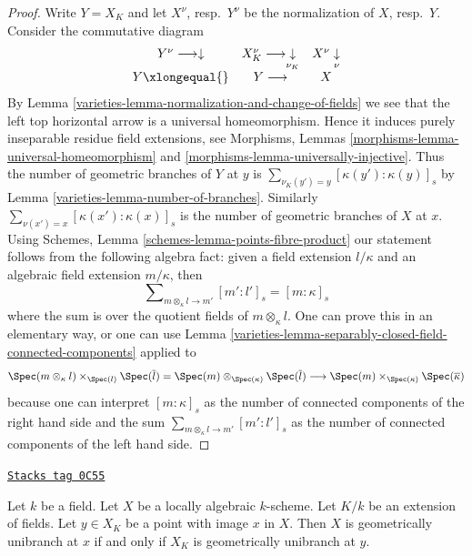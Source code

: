 \begin{proof}

Write $Y = X_K$ and let $X^\nu$, resp.\ $Y^\nu$ be the normalization
of $X$, resp.\ $Y$. Consider the commutative diagram
$$
\begin{array}{ccc}Y^\nu \longrightarrow\downarrow & X^\nu_K \longrightarrow\underset{\nu_K}{\downarrow} & X^\nu \underset{\nu}{\downarrow} \\ Y \xlongequal{} & Y \longrightarrow & X\end{array}
$$
By Lemma \ref{varieties-lemma-normalization-and-change-of-fields} we see that
the left top horizontal arrow is a universal homeomorphism.
Hence it induces purely inseparable residue field extensions, see
Morphisms, Lemmas \ref{morphisms-lemma-universal-homeomorphism} and
\ref{morphisms-lemma-universally-injective}.
Thus the number of geometric branches of $Y$ at $y$ is
$\sum_{\nu_K(y') = y} [\kappa(y') : \kappa(y)]_s$
by Lemma \ref{varieties-lemma-number-of-branches}. Similarly
$\sum_{\nu(x') = x} [\kappa(x') : \kappa(x)]_s$ is the number of
geometric branches of $X$ at $x$. Using Schemes, Lemma
\ref{schemes-lemma-points-fibre-product}
our statement follows from the following algebra fact:
given a field extension $l/\kappa$ and
an algebraic field extension $m/\kappa$, then
$$
\sum\nolimits_{m \otimes_\kappa l \to m'} [m' : l']_s = [m : \kappa]_s
$$
where the sum is over the quotient fields of $m \otimes_\kappa l$.
One can prove this in an elementary way, or one can use
Lemma \ref{varieties-lemma-separably-closed-field-connected-components}
applied to
$$
\Spec(m \otimes_\kappa l) \times_{\Spec(l)} \Spec(\overline{l}) =
\Spec(m) \otimes_{\Spec(\kappa)} \Spec(\overline{l})
\longrightarrow
\Spec(m) \times_{\Spec(\kappa)} \Spec(\overline{\kappa})
$$
because one can interpret $[m : \kappa]_s$ as the number of
connected components of the right hand side and the sum
$\sum_{m \otimes_\kappa l \to m'} [m' : l']_s$
as the number of connected components of the left hand side.
\end{proof}

\begin{lemma}
\label{varieties-lemma-geometrically-unibranch-and-change-of-fields}
\href{https://stacks.math.columbia.edu/tag/0C55}{\texttt{Stacks tag 0C55}}

Let $k$ be a field. Let $X$ be a locally algebraic $k$-scheme.
Let $K/k$ be an extension of fields. Let $y \in X_K$ be a
point with image $x$ in $X$. Then $X$ is geometrically unibranch
at $x$ if and only if $X_K$ is geometrically unibranch at $y$.
\end{lemma}

